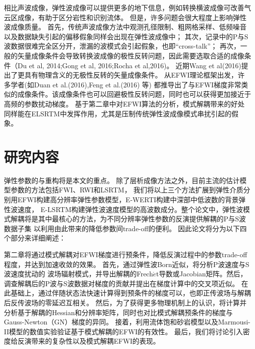 相比声波成像，弹性波成像可以提供更多的地下信息，例如转换横波成像可改善气云区成像，有助于区分岩性和识别流体。
但是，许多问题会很大程度上影响弹性波成像质量。
首先，传统声波成像方法中观测孔径限制、粗网格采样、低频噪音以及数据缺失引起的偏移假象同样会出现在弹性波成像中；
其次，记录中的P与S波数据很难完全区分开，泄漏的波模式会引起假象，也即“cross-talk”；
再次，一般的矢量成像条件会导致转换波成像的极性反转问题，因此需要选取合适的成像条件（Du et al,
2014\cite{DuEtAl2014};Gong et al, 2016\cite{GongEtAl2016};Rocha et al,2016\cite{RochaEtAl2016a})。
近期Wang et al(2016)\cite{WangChenlongEtAl2016}提出了更具有物理含义的无极性反转的矢量成像条件。
从EFWI理论框架出发，许多学者(如Duan et al.(2016)\cite{Duan2016},Feng et al.(2016)\cite{Feng2016} 等)
都推导出了与EFWI梯度非常类似的成像条件。该成像条件也可以回避极性反转问题，同时也可以获得更加接近于高频的参数扰动梯度。
基于第二章中对EFWI算法的分析，模式解耦带来的好处同样能在ELSRTM中发挥作用，尤其是压制传统弹性波成像模式串扰引起的假象。


\section{研究内容}
弹性参数的与重构将是本文的重点。
除了层析成像方法之外，目前主流的估计模型参数的方法包括FWI、RWI和LSRTM，
我们将以上三个方法扩展到弹性介质分别用EFWI构建高分辨率弹性参数模型，E-WERTI构建中深部中低波数的背景弹性波速度，
E-LSRTM构建弹性波速度模型的高波数成分。整个论文中，弹性波模式解耦将是其中最核心的方法，为不同分辨率弹性参数的反演提供解耦的P与S波数据子集
以利用由此带来的降低参数间trade-off的便利。
因此论文将分为以下四个部分来详细阐述：

第二章将通过模式解耦对EFWI梯度进行预条件，降低反演过程中的参数trade-off程度，并达到加速收敛的效果。
首先，通过弹性波Born近似，将分析P波速度与S波速度扰动的
波场辐射模式，并导出解耦的Frech{$\acute{e}$}t导数或Jacobian矩阵。然后，调查解耦后的P波与S波数据对梯度的贡献并提出在梯度计算中的交叉项近似。
在此基础上，通过伴随状态法快速计算得到预条件的梯度可以\cite[]{plessix2006}，也即正传波场与解耦后反传波场的零延迟互相关。
然后，为了获得更多物理机制上的认识，将计算并分析基于解耦的Hessian和分辨率矩阵，同时也对比模式解耦预条件的梯度与Gauss-Newton（GN）梯度的异同。
接着，利用流体饱和砂岩模型以及Marmousi-II模型的数值实验验证基于模式解耦的EFWI的有效性。
最后，我们将讨论引入密度给反演带来的复杂性以及模式解耦EFWI的表现。

